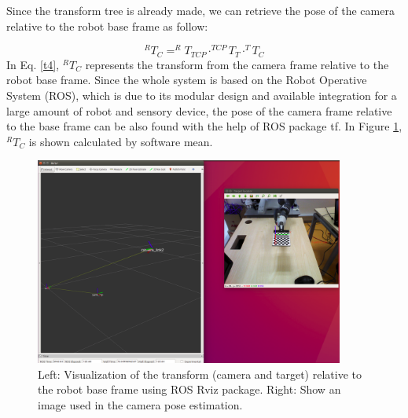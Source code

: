Since the transform tree is already made, we can retrieve the pose of the camera relative to the robot base frame as follow:

\begin{equation}
^{R}T_{C}= ^{R}T_{TCP} \cdot ^{TCP}T_{T} \cdot ^{T}T_{C}\label{t4}
\end{equation}
In Eq. \ref{t4}, $^{R}T_{C}$ represents the transform from the camera frame relative to the robot base frame. Since the whole system is based on the Robot Operative System (ROS), which is due to its modular design and available integration for a large amount of robot and sensory device, the pose of the camera frame relative to the base frame can be also found with the help of ROS package tf. In Figure \ref{fig:tf6}, $^{R}T_{C}$ is shown calculated by software mean. 


\begin{figure}[!h]
\begin{center}
\includegraphics[width=4in]{figures03/rviz1.png}
\caption{Left: Visualization of the transform (camera and target) relative to the robot base frame using ROS Rviz package. Right: Show an image used in the camera pose estimation.}
\label{fig:tf6}
\end{center}
\end{figure}






























